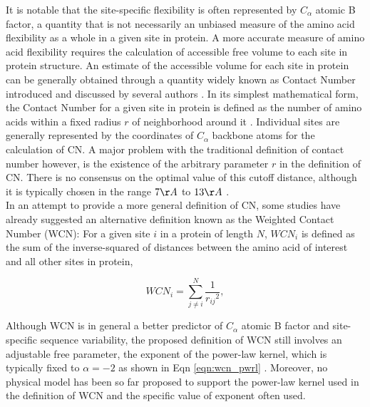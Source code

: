 \documentclass[11pt]{article}
\begin{document}
    It is notable that the site-specific flexibility is often represented by $C_\alpha$ atomic B factor, a quantity that is not necessarily an unbiased measure of the amino acid flexibility as a whole in a given site in protein. A more accurate measure of amino acid flexibility requires the calculation of accessible free volume to each site in protein structure. An estimate of the accessible volume for each site in protein can be generally obtained through a quantity widely known as Contact Number introduced and discussed by several authors \citep[e.g.,][]{liao_protein_2005}. In its simplest mathematical form, the Contact Number for a given site in protein is defined as the number of amino acids within a fixed radius $r$ of neighborhood around it \citep[e.g.,][]{franzosa_structural_2009}. Individual sites are generally represented by the coordinates of $C_\alpha$ backbone atoms for the calculation of CN. A major problem with the traditional definition of contact number however, is the existence of the arbitrary parameter $r$ in the definition of CN. There is no consensus on the optimal value of this cutoff distance, although it is typically chosen in the range $7\AA$ to $13\AA$ \citep[e.g.,][]{lin_deriving_2008, franzosa_structural_2009}. \\

    In an attempt to provide a more general definition of CN, some studies \citep[e.g.,][]{lin_deriving_2008} have already suggested an alternative definition known as the Weighted Contact Number (WCN): For a given site $i$ in a protein of length $N$, $WCN_i$ is defined as the sum of the inverse-squared of distances between the amino acid of interest and all other sites in protein,

        \begin{equation}
            \label{eqn:wcn_pwrl}
            WCN_{i} = \sum^N_{j\neq i} \frac{1}{{r_{ij}}^{2}},
        \end{equation}

    Although WCN is in general a better predictor of $C_\alpha$ atomic B factor and site-specific sequence variability, the proposed definition of WCN still involves an adjustable free parameter, the exponent of the power-law kernel, which is typically fixed to $\alpha=-2$ as shown in Eqn \ref{eqn:wcn_pwrl} \citep[e.g.,][]{yang_protein_2009}. Moreover, no physical model has been so far proposed to support the power-law kernel used in the definition of WCN and the specific value of exponent often used. \\
\end{document}
